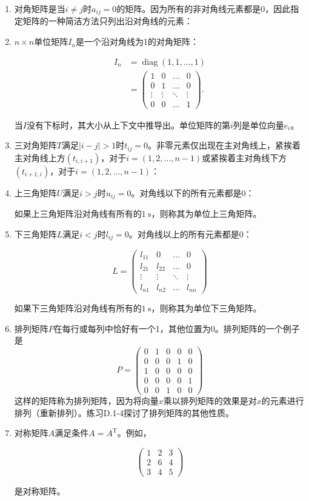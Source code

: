 \documentclass[lang=cn,newtx,10pt,scheme=chinese]{elegantbook}
\begin{document}
\begin{enumerate}
\item 对角矩阵是当$i \neq j$时$a_{i j}=0$的矩阵。因为所有的非对角线元素都是0，因此指定矩阵的一种简洁方法只列出沿对角线的元素：
\item $n \times n$单位矩阵$I_n$是一个沿对角线为1的对角矩阵：

$$
\begin{aligned}
I_n & =\operatorname{diag}(1,1, \ldots, 1) \\
& =(\begin{array}{cccc}
1 & 0 & \ldots & 0 \\
0 & 1 & \ldots & 0 \\
\vdots & \vdots & \ddots & \vdots \\
0 & 0 & \ldots & 1
\end{array}) .
\end{aligned}
$$

当$I$没有下标时，其大小从上下文中推导出。单位矩阵的第$i$列是单位向量$e_i$。
\item 三对角矩阵$T$满足$|i-j|>1$时$t_{i j}=0$。非零元素仅出现在主对角线上，紧挨着主对角线上方$(t_{i, i+1})$，对于$i=(1,2, \ldots, n-1)$或紧挨着主对角线下方$(t_{i+1, i})$，对于$i=(1,2, \ldots, n-1)$：
\item 上三角矩阵$U$满足$i>j$时$u_{i j}=0$。对角线以下的所有元素都是0：

如果上三角矩阵沿对角线有所有的$1 \mathrm{~s}$，则称其为单位上三角矩阵。
\item 下三角矩阵$L$满足$i<j$时$l_{i j}=0$。对角线以上的所有元素都是0：

$$
L=(\begin{array}{cccc}
l_{11} & 0 & \ldots & 0 \\
l_{21} & l_{22} & \ldots & 0 \\
\vdots & \vdots & \ddots & \vdots \\
l_{n 1} & l_{n 2} & \ldots & l_{n n}
\end{array})
$$

如果下三角矩阵沿对角线有所有的$1 \mathrm{~s}$，则称其为单位下三角矩阵。
\item 排列矩阵$P$在每行或每列中恰好有一个1，其他位置为0。排列矩阵的一个例子是
$$
P=(\begin{array}{lllll}
0 & 1 & 0 & 0 & 0 \\
0 & 0 & 0 & 1 & 0 \\
1 & 0 & 0 & 0 & 0 \\
0 & 0 & 0 & 0 & 1 \\
0 & 0 & 1 & 0 & 0
\end{array})
$$
这样的矩阵称为排列矩阵，因为将向量$x$乘以排列矩阵的效果是对$x$的元素进行排列（重新排列）。练习D.1-4探讨了排列矩阵的其他性质。
\item 对称矩阵$A$满足条件$A=A^{\mathrm{T}}$。例如，

$$
(\begin{array}{lll}
1 & 2 & 3 \\
2 & 6 & 4 \\
3 & 4 & 5
\end{array})
$$

是对称矩阵。
\end{enumerate}
\end{document}
